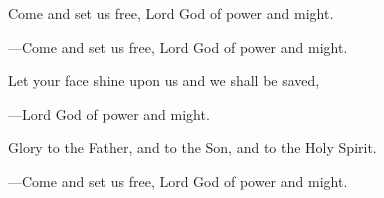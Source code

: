 \responsory

\begin{hangpar}
Come and set us free, Lord God of power and might.

{\color{red}---\thinspace }Come and set us free, Lord God of power and might.

\medskip Let your face shine upon us and we shall be saved,

{\color{red}---\thinspace }Lord God of power and might.

\medskip Glory to the Father, and to the Son, and to the Holy Spirit.

{\color{red}---\thinspace }Come and set us free, Lord God of power and might.
\end{hangpar}